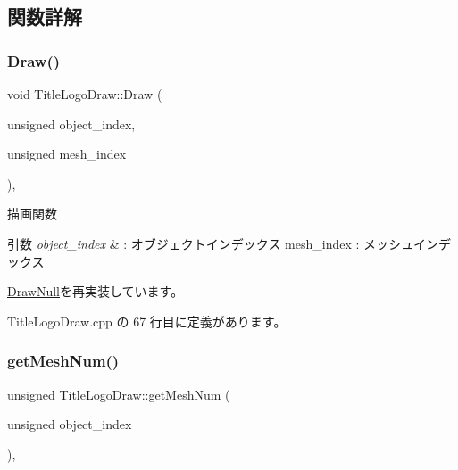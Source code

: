 \subsection{関数詳解}
\mbox{\label{class_title_logo_draw_a01e4cb21d580bac86a226fa2e35bf4a3}} 
\subsubsection{\texorpdfstring{Draw()}{Draw()}}
{\footnotesize\ttfamily void Title\+Logo\+Draw\+::\+Draw (\begin{DoxyParamCaption}\item[{unsigned}]{object\+\_\+index,  }\item[{unsigned}]{mesh\+\_\+index }\end{DoxyParamCaption})\hspace{0.3cm}{\ttfamily [override]}, {\ttfamily [virtual]}}



描画関数 


\begin{DoxyParams}{引数}
{\em object\+\_\+index} & \+: オブジェクトインデックス mesh\+\_\+index \+: メッシュインデックス \\
\hline
\end{DoxyParams}


\mbox{\hyperlink{class_draw_null_afe50f6fd820b18d673f70f048743f339}{Draw\+Null}}を再実装しています。



 Title\+Logo\+Draw.\+cpp の 67 行目に定義があります。

\mbox{\label{class_title_logo_draw_a20a0e0c3569e49eb421ab4b5a65777cd}} 
\subsubsection{\texorpdfstring{get\+Mesh\+Num()}{getMeshNum()}}
{\footnotesize\ttfamily unsigned Title\+Logo\+Draw\+::get\+Mesh\+Num (\begin{DoxyParamCaption}\item[{unsigned}]{object\+\_\+index }\end{DoxyParamCaption})\hspace{0.3cm}{\ttfamily [override]}, {\ttfamily [virtual]}}



